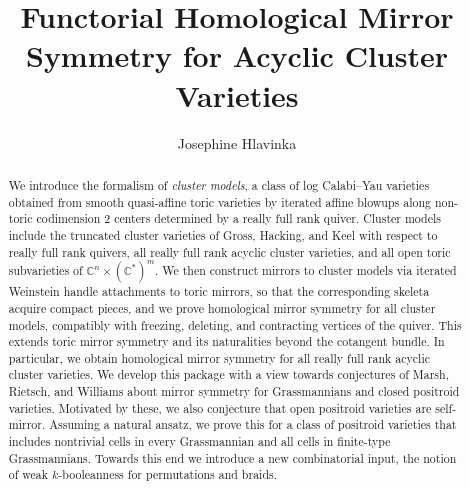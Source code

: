 \documentclass[11pt]{amsart}
\title{Functorial Homological Mirror Symmetry for Acyclic Cluster Varieties}
\author{Josephine Hlavinka}
\theoremstyle{definition}
\theoremstyle{remark}
\numberwithin{equation}{section}
\begin{document}
\begin{abstract}
We introduce the formalism of \textit{cluster models}, a class of log Calabi–Yau varieties obtained from smooth quasi-affine toric varieties by iterated affine blowups along non-toric codimension 2 centers determined by a really full rank quiver. Cluster models include the truncated cluster varieties of Gross, Hacking, and Keel with respect to really full rank quivers, all really full rank acyclic cluster varieties, and all open toric subvarieties of $\mathbb C^n\times(\mathbb C^*)^m$. We then construct mirrors to cluster models via iterated Weinstein handle attachments to toric mirrors, so that the corresponding skeleta acquire compact pieces, and we prove homological mirror symmetry for all cluster models, compatibly with freezing, deleting, and contracting vertices of the quiver. This extends toric mirror symmetry and its naturalities beyond the cotangent bundle. In particular, we obtain homological mirror symmetry for all really full rank acyclic cluster varieties. We develop this package with a view towards conjectures of Marsh, Rietsch, and Williams about mirror symmetry for Grassmannians and closed positroid varieties. Motivated by these, we also conjecture that open positroid varieties are self-mirror. Assuming a natural ansatz, we prove this for a class of positroid varieties that includes nontrivial cells in every Grassmannian and all cells in finite-type Grassmannians. Towards this end we introduce a new combinatorial input, the notion of weak $k$-booleanness for permutations and braids.
    
    
\end{abstract}
\maketitle
\tableofcontents
\bigskip
\end{document}
